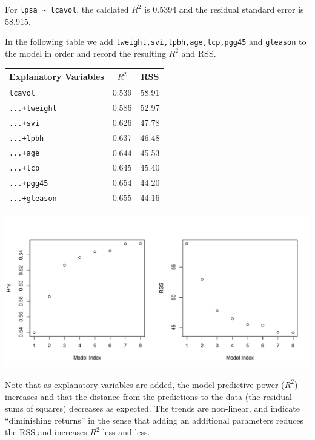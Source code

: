 \documentclass{homework}
\begin{document}
\begin{solution}
For \verb|lpsa ~ lcavol|, the calclated $R^2$ is 0.5394 and the residual standard error is 58.915.

In the following table we add \texttt{lweight,svi,lpbh,age,lcp,pgg45} and \texttt{gleason} to the model in order
and record the resulting $R^2$ and RSS.

\begin{minipage}{.48\textwidth}
\begin{tabular}{l | c c}
\hline
Explanatory Variables & $R^2$ & RSS \\ \hline
\texttt{lcavol} &      0.539 & 58.91 \\
\texttt{...+lweight} & 0.586 & 52.97 \\
\texttt{...+svi} &     0.626 & 47.78 \\
\texttt{...+lpbh} &    0.637 & 46.48 \\
\texttt{...+age} &     0.644 & 45.53 \\
\texttt{...+lcp} &     0.645 & 45.40 \\
\texttt{...+pgg45} &   0.654 & 44.20 \\
\texttt{...+gleason} & 0.655 & 44.16 \\
\hline
\end{tabular}
\end{minipage}
\begin{minipage}{.48\textwidth}
\includegraphics[width=\textwidth]{parameter_add_trends.pdf}
\end{minipage}

Note that as explanatory variables are added, the model predictive
power ($R^2$) increases and that the distance from the predictions
to the data (the residual sums of squares) decreases as expected.  The trends are non-linear, and indicate ``diminishing returns'' in the sense that adding an additional parameters reduces the RSS and increases $R^2$ less and less.  
\end{solution}
\end{document}
